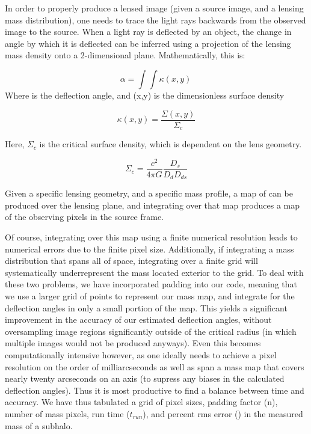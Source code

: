 
In order to properly produce a lensed image (given a source image, and a 
lensing mass distribution), one needs to trace the light rays backwards 
from the observed image to the source.  When a light ray is deflected by an 
object, the change in angle by which it is deflected \alpha can be inferred
using a projection of the lensing mass density onto a 2-dimensional plane.
Mathematically, this is: 

\begin{equation} \alpha = \int\int \kappa(x,y) \frac{}{}
\end{equation}
Where \alpha is the deflection angle, and \kappa(x,y) is the dimensionless
surface density

\begin{equation} \kappa(x,y) = \frac{\Sigma(x,y)}{\Sigma_{c}}

\end{equation}

Here, $\Sigma_{c}$ is the critical surface density, which is dependent on the
lens geometry.

\begin{equation} \Sigma_{c} = \frac{c^2}{4\pi G}\frac{D_{s}}{D_{d}D_{ds}}
\end{equation}

Given a specific lensing geometry, and a specific mass profile, a map of 
\kappa can be produced over the lensing plane, and integrating over that map
produces a map of the observing pixels in the source frame.

Of course, integrating over this map using a finite numerical resolution 
leads to numerical errors due to the finite pixel size.  Additionally, if
integrating a mass distribution that spans all of space, integrating over a finite 
grid will systematically underrepresent the mass located exterior to the grid.
To deal with these two problems, we have incorporated padding into our code, meaning 
that we use a larger grid of points to represent our mass map, and integrate for 
the deflection angles in only a small portion of the map.  This yields a significant
improvement in the accuracy of our estimated deflection angles, without oversampling 
image regions significantly outside of the critical radius (in which multiple images
would not be produced anyways).  Even this becomes computationally intensive however,
as one ideally needs to achieve a pixel resolution on the order of milliarcseconds as 
well as span a mass map that covers nearly twenty arcseconds on an axis (to supress
any biases in the calculated deflection angles).  Thus it is most productive to find 
a balance between time and accuracy.  We have thus tabulated a grid of pixel sizes, 
padding factor (n), number of mass pixels, run time ($t_{run}$), and percent rms error (\epsilon) in the 
measured mass of a subhalo.


